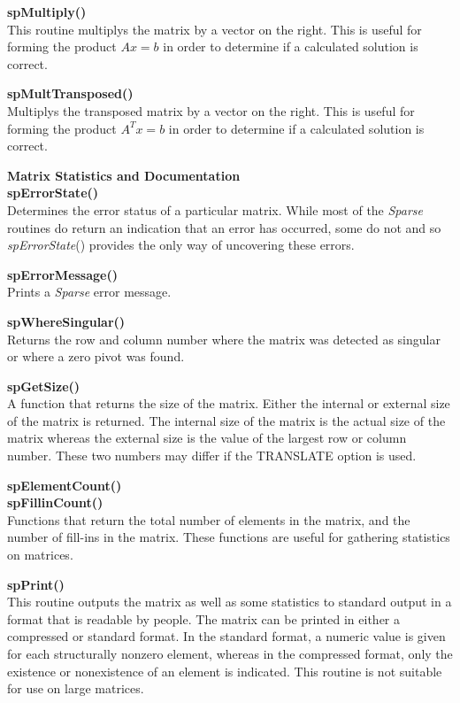 \documentclass[11pt]{article}
\begin{document}
{\bf spMultiply()}\\
This routine multiplys the matrix by a vector on the
right.  This is useful for forming the product $Ax = b$
in order to determine if a calculated solution is correct.

{\bf spMultTransposed()}\\
Multiplys the transposed matrix by a vector on the right.  This is useful
for forming the product $A^T x = b$
in order to determine if a calculated solution is correct.

{\bf Matrix Statistics and Documentation}\\

{\bf spErrorState()}\\
Determines the error status of a particular matrix.  While most of the
\emph{Sparse} routines do return an indication that an error has
occurred, some do not and so \emph{spErrorState}() provides the only way of
uncovering these errors.

{\bf spErrorMessage()}\\
Prints a \emph{Sparse} error message.

{\bf spWhereSingular()}\\
Returns the row and column number where the matrix was detected as 
singular or where a zero pivot was found.

{\bf spGetSize()}\\
A function that returns the size of the matrix.  Either the internal or
external size of the matrix is returned.  The internal size of the
matrix is the actual size of the matrix whereas the external size is
the value of the largest row or column number.  These two numbers may
differ if the TRANSLATE option is used.

{\bf spElementCount()}\\
{\bf spFillinCount()}\\
Functions that return the total number of elements in the matrix, and the
number of fill-ins in the matrix.  These functions are useful for gathering
statistics on matrices.

{\bf spPrint()}\\
This routine outputs the matrix as well as some statistics to standard
output in a format that is readable by people.  The matrix can be
printed in either a compressed or standard format.  In the standard
format, a numeric value is given for each structurally nonzero element,
whereas in the compressed format, only the existence or nonexistence of
an element is indicated.  This routine is not suitable for use on large
matrices.
\end{document}
